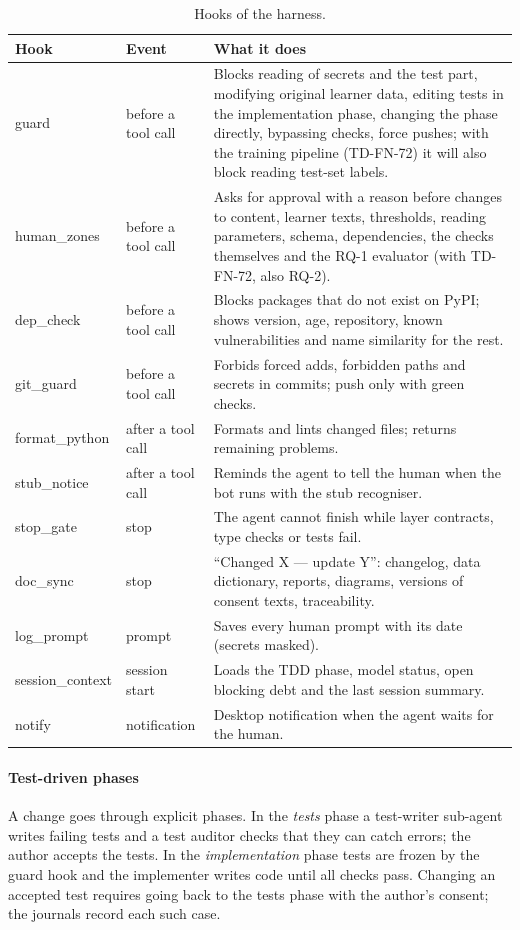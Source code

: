 \begin{table}[ht]
\centering\small
\caption{Hooks of the harness.}
\label{tab:hooks}
\begin{tabularx}{\linewidth}{@{}P{3.0cm}P{2.3cm}L@{}}
\toprule
Hook & Event & What it does \\
\midrule
guard & before a tool call & Blocks reading of secrets and the test part, modifying original learner data, editing tests in the
implementation phase, changing the phase directly, bypassing checks, force pushes; with the training
pipeline (TD-FN-72) it will also block reading test-set labels. \\
human\_zones & before a tool call & Asks for approval with a reason before changes to content, learner
texts, thresholds, reading parameters, schema, dependencies, the checks themselves and the RQ-1
evaluator (with TD-FN-72, also RQ-2). \\
dep\_check & before a tool call & Blocks packages that do not exist on PyPI; shows version, age,
repository, known vulnerabilities and name similarity for the rest. \\
git\_guard & before a tool call & Forbids forced adds, forbidden paths and secrets in commits; push only
with green checks. \\
format\_python & after a tool call & Formats and lints changed files; returns remaining problems. \\
stub\_notice & after a tool call & Reminds the agent to tell the human when the bot runs with the stub
recogniser. \\
stop\_gate & stop & The agent cannot finish while layer contracts, type checks or tests fail. \\
doc\_sync & stop & ``Changed X --- update Y'': changelog, data dictionary, reports, diagrams, versions of
consent texts, traceability. \\
log\_prompt & prompt & Saves every human prompt with its date (secrets masked). \\
session\_context & session start & Loads the TDD phase, model status, open blocking debt and the last
session summary. \\
notify & notification & Desktop notification when the agent waits for the human. \\
\bottomrule
\end{tabularx}
\end{table}

\paragraph{Test-driven phases} A change goes through explicit phases. In the \emph{tests} phase a test-writer
sub-agent writes failing tests and a test auditor checks that they can catch errors; the author accepts the
tests. In the \emph{implementation} phase tests are frozen by the guard hook and the implementer writes code
until all checks pass. Changing an accepted test requires going back to the tests phase with the author's
consent; the journals record each such case.

